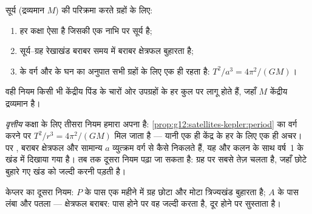 \begin{theorem}[केप्लर के नियम]\label{thm:g12:satellites-kepler:kepler}
%
सूर्य (द्रव्यमान $M$) की परिक्रमा करते ग्रहों के लिए:
\begin{enumerate}
  \item हर कक्षा ऐसा  है जिसकी एक नाभि पर सूर्य है;
  \item सूर्य--ग्रह रेखाखंड बराबर समय में बराबर क्षेत्रफल बुहारता है;
  \item {} के वर्ग और  के घन का अनुपात
        सभी ग्रहों के लिए एक ही रहता है: $T^2/a^3 = 4\pi^2/(G M)$।
\end{enumerate}
वही नियम किसी भी केंद्रीय पिंड के चारों ओर उपग्रहों के हर कुल पर लागू
होते हैं, जहाँ $M$ केंद्रीय द्रव्यमान है। \admitted
\end{theorem}

\begin{remark}[इस वर्ष हम क्या सिद्ध कर सकते हैं]\label{rem:g12:satellites-kepler:proof}
\emph{वृत्तीय} कक्षा के लिए तीसरा नियम हमारा अपना है: \cref{prop:g12:satellites-kepler:period} का वर्ग
करने पर $T^2/r^3 = 4\pi^2/(GM)$ मिल जाता है --- यानी एक ही केंद्र के हर  के लिए
एक ही अचर। पर , बराबर क्षेत्रफल और सामान्य $a$
व्युत्क्रम वर्ग से कैसे निकलते हैं, यह और कलन के साथ वर्ष~1 के खंड में दिखाया
गया है। तब तक दूसरा नियम पढ़ा जा सकता है: ग्रह  पर सबसे तेज़ चलता
है, जहाँ छोटे बुहारे गए खंड को जल्दी करनी पड़ती है।
\end{remark}

\begin{omfigure}

{\small केप्लर का दूसरा नियम:  $P$ के पास एक महीने में ग्रह
छोटा और मोटा त्रिज्यखंड बुहारता है;  $A$ के पास लंबा और
पतला --- क्षेत्रफल बराबर: पास होने पर वह जल्दी करता है, दूर होने पर
सुस्ताता है।}
\end{omfigure}

